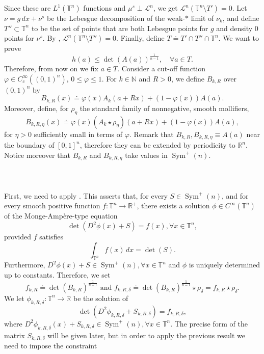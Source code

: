 \documentclass[10pt,reqno]{amsart}
\numberwithin{equation}{section}
\newcommand{\R}{\mathbb{R}}
\newcommand{\T}{\mathbb{T}}
\newcommand{\N}{\mathbb{N}}
\DeclareMathOperator{\Sym}{Sym}
\theoremstyle{plain}
\theoremstyle{definition}
\theoremstyle{remark}
\begin{document}
Since these are  $L^1(\T^n)$ functions and $\mu^s\perp \mathcal{L}^n$, we get $\mathcal{L}^n(\T^n\setminus T') = 0$.  Let $\nu = g\,dx + \nu^s$ be the Lebesgue decomposition of the weak-$*$ limit of $\nu_k$, and define $T'' \subset \T^n$ to be the set of points that are both Lebesgue points for $g$ and density $0$ points for $\nu^s$. By \cite[Thm. 1.31]{EVG}, $\mathcal{L}^n(\T^n\setminus T'') =0$. Finally, define $T \doteq T'\cap T''\cap \T^n$. We want to prove
\begin{equation}\label{FM_ineq}
h(a) \le \det(A(a))^{\frac{1}{n - 1}}, \quad \forall a \in T.
\end{equation}
Therefore, from now on we fix $a \in T$. Consider a cut-off function  $\varphi \in C^\infty_c((0,1)^n)$, $0\leq \varphi\leq 1$. For $k \in \N$ and $R>0$, we define $B_{k,R}$ over $(0,1)^n$ by
\[
B_{k,R}(x)\doteq \varphi(x) A_{k}(a+Rx) + (1 - \varphi(x))A(a).
\]
Moreover, define, for $\rho_\eta$ the standard family of nonnegative, smooth mollifiers,
\[
B_{k,R,\eta}(x) \doteq  \varphi(x) (A_{k}\star \rho_\eta)(a+Rx) + (1 - \varphi(x))A(a),
\]
for $\eta>0$ sufficiently small in terms of  $\varphi$. Remark that $B_{k,R}, B_{k,R,\eta}\equiv A(a)$ near the boundary of $[0,1]^n$, therefore they can be extended by periodicity to $\R^n$. Notice moreover that $B_{k,R}$ and $B_{k,R,\eta}$ take values in $\Sym^+(n)$.
\\
\\
\indent{}
\\
\\
First, we need to apply \cite[Thm. 2.2]{YAN}. This asserts that, for every $S \in \Sym^+(n)$, and for every smooth positive function $f:\T^n \to \R^+$, there exists a solution $\phi \in C^\infty(\T^n)$ of the Monge-Amp\`ere-type equation
\[
\det(D^2\phi(x) + S) = f(x), \forall x \in \T^n,
\]
provided $f$ satisfies
\[
\int_{\T^n}f(x)\,dx = \det(S).
\]
Furthermore, $D^2\phi(x) + S \in \Sym^+(n), \forall x \in \T^n$ and $\phi$ is uniquely determined up to constants. Therefore, we set
\[
f_{k,R}\doteq \det(B_{k,R})^{\frac{1}{n - 1}} \text{ and } f_{k,R,\delta}\doteq \det(B_{k,R})^{\frac{1}{n - 1}}\star \rho_\delta=f_{k,R}\star \rho_\delta.
\]
We let $\phi_{k,R,\delta}: \T^n \to \R$ be the solution of 
\begin{equation}\label{eq_c}
\det(D^2\phi_{k,R,\delta} + S_{k,R,\delta}) = f_{k,R,\delta},
\end{equation}
where $D^2\phi_{k,R,\delta}(x) + S_{k,R,\delta} \in \Sym^+(n), \forall x \in \T^n$. The precise form of the matrix $S_{k,R,\delta}$ will be given later, but in order to apply the previous result we need to impose the constraint
\end{document}
